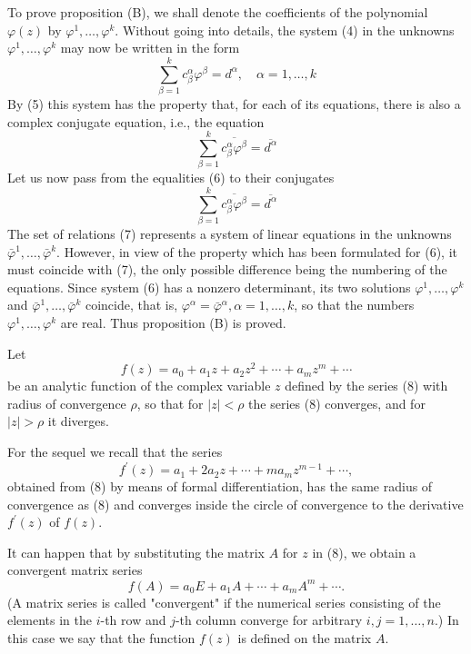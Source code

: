 \documentclass[10pt,a5paper]{book}
\theoremstyle{plain}
\theoremstyle{definition}
\theoremstyle{remark}
\begin{document}
To prove proposition (B), we shall denote the coefficients of the polynomial $\varphi(z)$ by $\varphi^{1}, \ldots, \varphi^{k}$. Without going into details, the system (4) in the unknowns $\varphi^{1}, \ldots, \varphi^{k}$ may now be written in the form
\begin{equation*}
\sum_{\beta=1}^{k} c_{\beta}^{\alpha} \varphi^{\beta}=d^{\alpha}, \quad \alpha=1, \ldots, k \tag{6}
\end{equation*}
By (5) this system has the property that, for each of its equations, there is also a complex conjugate equation, i.e., the equation
\[
\sum_{\beta=1}^{k} \overline{c_{\beta}^{\alpha} \varphi^{\beta}}=\overline{d^{\alpha}}
\]
Let us now pass from the equalities (6) to their conjugates
\begin{equation*}
\sum_{\beta=1}^{k} \overline{c_{\beta}^{\alpha} \varphi^{\beta}}=\overline{d^{\alpha}} \tag{7}
\end{equation*}
The set of relations (7) represents a system of linear equations in the unknowns $\bar{\varphi}^{1}, \ldots, \bar{\varphi}^{k}$. However, in view of the property which has been formulated for (6), it must coincide with (7), the only possible difference being the numbering of the equations. Since system (6) has a nonzero determinant, its two solutions $\varphi^{1}, \ldots, \varphi^{k}$ and $\bar{\varphi}^{1}, \ldots, \bar{\varphi}^{k}$ coincide, that is, $\varphi^{\alpha}=\bar{\varphi}^{\alpha}, \alpha=1, \ldots, k$, so that the numbers $\varphi^{1}, \ldots, \varphi^{k}$ are real. Thus proposition (B) is proved.

Let
\begin{equation*}
f(z)=a_{0}+a_{1} z+a_{2} z^{2}+\cdots+a_{m} z^{m}+\cdots \tag{8}
\end{equation*}
be an analytic function of the complex variable $z$ defined by the series (8) with radius of convergence $\rho$, so that for $|z|<\rho$ the series (8) converges, and for $|z|>\rho$ it diverges.

For the sequel we recall that the series
\[
f^{\prime}(z)=a_{1}+2 a_{2} z+\cdots+m a_{m} z^{m-1}+\cdots,
\]
obtained from (8) by means of formal differentiation, has the same radius of convergence as (8) and converges inside the circle of convergence to the derivative $f^{\prime}(z)$ of $f(z)$.

It can happen that by substituting the matrix $A$ for $z$ in (8), we obtain a convergent matrix series
\begin{equation*}
f(A)=a_{0} E+a_{1} A+\cdots+a_{m} A^{m}+\cdots . \tag{9}
\end{equation*}
(A matrix series is called "convergent" if the numerical series consisting of the elements in the $i$-th row and $j$-th column converge for arbitrary
$i, j=1, \ldots, n$.) In this case we say that the function $f(z)$ is defined on the matrix $A$.
\end{document}
